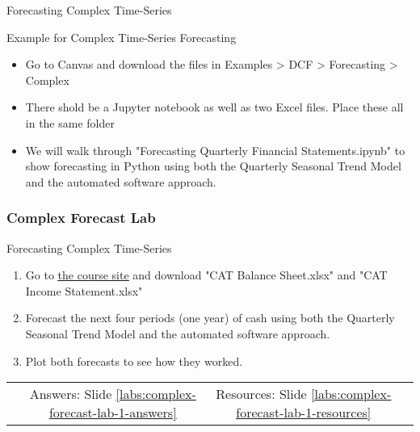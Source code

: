 \documentclass[handout, 11pt]{beamer}
\begin{document}
\begin{section}{Forecasting Complex Time-Series}
\begin{frame}
{\begin{block}{Example for Complex Time-Series Forecasting}
\begin{itemize}
\item Go to Canvas and download the files in Examples > DCF > Forecasting > Complex
\item There shold be a Jupyter notebook as well as two Excel files. Place these all in the same folder
\item We will walk through "Forecasting Quarterly Financial Statements.ipynb" to show forecasting in Python using both the Quarterly Seasonal Trend Model and the automated software approach.
\end{itemize}
\end{block}
}
\end{frame}
\begin{frame}
\frametitle{Complex Forecast Lab}
{
\begin{block}{Forecasting Complex Time-Series}
\begin{enumerate}
\item Go to
\textcolor{blue}{\underline{\href{https://nickderobertis.github.io/fin-model-course/}{the course site}}}
and download "CAT Balance Sheet.xlsx" and "CAT Income Statement.xlsx"
\item Forecast the next four periods (one year) of cash using both the Quarterly Seasonal Trend Model and the automated software approach.
\item Plot both forecasts to see how they worked.
\end{enumerate}
\vfill
\begin{tabular*}{\textwidth}{@{\extracolsep{\fill}}cccc}
\toprule
\hfill & Answers: Slide \textcolor{blue}{\underline{\ref{labs:complex-forecast-lab-1-answers}}} & Resources: Slide \textcolor{blue}{\underline{\ref{labs:complex-forecast-lab-1-resources}}} & \hfill\\

\end{tabular*}
\end{block}
}
\label{labs:complex-forecast-lab-1}
\end{frame}
\end{section}
\end{document}
